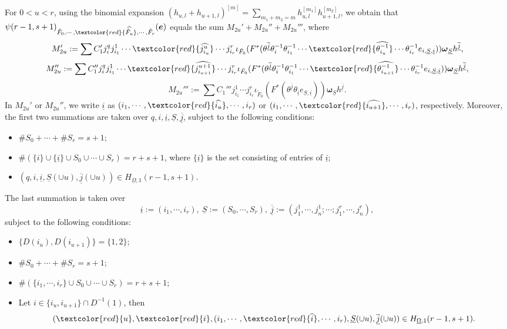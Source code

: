 \documentclass[12pt, a4paper]{article}
\begin{document}
For $0<u<r$, using the binomial expansion $(h_{u,l}+h_{u+1,l})^{[m]}=\sum_{m_1+m_2=m}h_{u,l}^{[m_1]}h_{u+1,l}^{[m_2]}$, we obtain that $\psi(r-1,s+1)_{\tilde F_0,\cdots,\textcolor{red}{\widehat{\tilde F_u}},\cdots,\tilde F_r}(\boldsymbol{e})$ equals the sum $M_{2u}'+M_{2u}''+M_{2u}'''$, where
$$
M'_{2u}:=\sum C_1'j^q_ij^1_{i_1}\cdots\textcolor{red}{\widehat{j^u_{i_u}}}\cdots j^r_{i_r}\iota_{\tilde F_0}(F^*(\theta^{\underline{\overline j}}\theta_i^{-1}\theta_{i_1}^{-1}\cdots\textcolor{red}{\widehat{\theta_{i_u}^{-1}}}\cdots\theta_{i_r}^{-1}e_{i,\underline S,\underline i}))\boldsymbol{\omega}_{\underline S} h^{\underline{\overline j}},$$
$$
M_{2u}'':=\sum C_1''j^q_ij^1_{i_1}\cdots\textcolor{red}{\widehat{j^{u+1}_{i_{u+1}}}}\cdots j^r_{i_r}\iota_{\tilde F_0}(F^*(\theta^{\underline{\overline j}}\theta_i^{-1}\theta_{i_1}^{-1}\cdots\textcolor{red}{\widehat{\theta_{i_{u+1}}^{-1}}}\cdots\theta_{i_r}^{-1}e_{i,\underline S,\underline i}))\boldsymbol{\omega}_{\underline S} h^{\underline{\overline j}},$$
$$
M_{2u}''':=\sum C_1'''j^1_{i_1}\cdots j^r_{i_r}\iota_{\tilde F_0}(F^*(\theta^{\underline{\overline j}}\theta_{\underline i}e_{\underline S,\underline i}))\boldsymbol{\omega}_{\underline S} h^{\underline{\overline j}}.
$$
In $M_{2u}'$ or $M_{2u}''$, we write $\underline i$ as $(i_1,\cdots,\textcolor{red}{\widehat{i_u}},\cdots,i_r)$ or $(i_1,\cdots,\textcolor{red}{\widehat{i_{u+1}}},\cdots,i_r)$, respectively. Moreover, the first two summations are taken over $q,i,\underline i,\underline S,\underline{\overline j}$,
subject to the following conditions:
\begin{itemize}
    \item $\#S_0+\cdots+\#S_r=s+1$;
    \item $\#(\{i\}\cup\{\underline i\}\cup S_0\cup\cdots\cup S_r)=r+s+1$, where $\{\underline i\}$ is the set consisting of entries of $\underline i$;
    \item $(q,i,\underline i,\underline S(\cup u),\overline{\underline j}(\cup u))\in H_{\underline\Omega,1}(r-1,s+1)$.
\end{itemize}
The last summation is taken over
$$\underline i:=(i_1,\cdots,i_r),~\underline S:=(S_0,\cdots,S_r),~\underline{\overline j}:=(j^1_1,\cdots,j^1_n;\cdots;j^r_1,\cdots,j^r_n),$$
subject to the following conditions:
\begin{itemize}
\item  $\{D(i_u),D(i_{u+1})\}=\{1,2\}$;
    \item $\#S_0+\cdots+\#S_r=s+1$;
    \item $\#(\{i_1,\cdots,i_r\}\cup S_0\cup\cdots\cup S_r)=r+s+1$;
    \item Let $i\in\{i_u,i_{u+1}\}\cap D^{-1}(1)$, then
    $$(\textcolor{red}{u},\textcolor{red}{i},(i_1,\cdots,\textcolor{red}{\widehat{i}},\cdots,i_r),\underline S(\cup u),\overline{\underline j}(\cup u))\in H_{\underline\Omega,1}(r-1,s+1).$$ 
\end{itemize}
\end{document}
